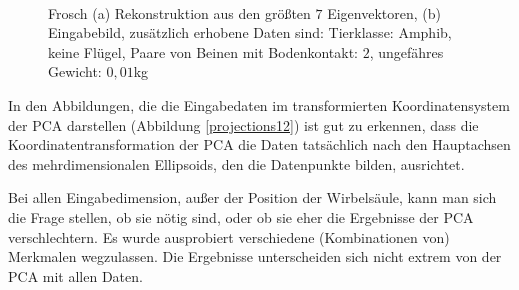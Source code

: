\begin{figure}
  \centering
  \\
  
  \caption{Frosch (a) Rekonstruktion aus den größten $7$ Eigenvektoren, (b) Eingabebild, zusätzlich erhobene Daten sind:
  Tierklasse: Amphib, keine Flügel, Paare von Beinen mit Bodenkontakt: $2$, ungefähres Gewicht: $0,01$kg}
  \label{frosch}
 \end{figure}
 

 In den Abbildungen, die die Eingabedaten im transformierten Koordinatensystem der PCA darstellen (Abbildung \ref{projections12}) ist gut zu erkennen, dass die Koordinatentransformation der PCA die Daten tatsächlich nach den Hauptachsen des mehrdimensionalen Ellipsoids, den die Datenpunkte bilden, ausrichtet.

 Bei allen Eingabedimension, außer der Position der Wirbelsäule, kann man sich die Frage stellen, ob sie nötig sind, oder ob sie eher die Ergebnisse der PCA verschlechtern. Es wurde ausprobiert verschiedene (Kombinationen von) Merkmalen wegzulassen. Die Ergebnisse unterscheiden sich nicht extrem von der PCA mit allen Daten. 
 
